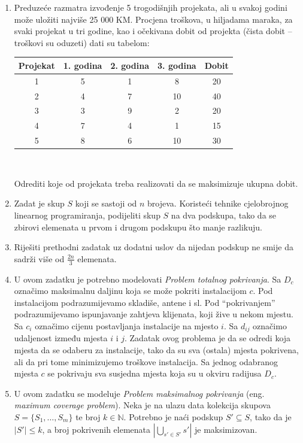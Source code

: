 \documentclass[a4paper, utf8, 11pt, colorlinks]{book}
\theoremstyle{definition}
\begin{document}
\begin{enumerate}
	
	\item Preduzeće  razmatra izvođenje 5 trogodišnjih projekata, ali u svakoj godini može uložiti najviše
	25 000 KM. Procjena troškova, u hiljadama maraka, za svaki projekat u tri godine, kao i
	očekivana dobit od projekta (čista dobit – troškovi su oduzeti)  dati su tabelom:
\begin{center}

	\begin{tabular}{|c|c|c|c|c|}
		\hline
		Projekat & 1. godina & 2. godina & 3. godina & Dobit \\
		\hline
		1 & 5 & 1 & 8 & 20 \\
		\hline
		2 & 4 & 7 & 10 & 40 \\
		\hline
		3 & 3 & 9 & 2 & 20 \\
		\hline
		4 & 7 & 4 & 1 & 15 \\
		\hline
		5 & 8 & 6 & 10 & 30 \\
		\hline
	\end{tabular}  \\
\end{center}
	Odrediti koje od projekata treba realizovati da se maksimizuje ukupna dobit.
	
	\item Zadat je skup $S$ koji se sastoji od $n$ brojeva. Koristeći tehnike cjelobrojnog linearnog programiranja, podijeliti skup $S$ na dva podskupa, tako da se zbirovi elemenata u prvom i drugom podskupu što manje razlikuju.
	
	\item Riješiti prethodni zadatak uz dodatni uslov da nijedan podskup ne smije da sadrži više od $\frac {2n}3$ elemenata.
	

	
	\item U ovom zadatku je potrebno modelovati \emph{Problem totalnog pokrivanja}. %
	Sa $D_c$ označimo maksimalnu daljinu koja se može pokriti instalacijom $c$. Pod instalacijom podrazumijevamo skladiše, antene i sl. Pod ``pokrivanjem'' podrazumijevamo ispunjavanje zahtjeva klijenata, koji žive u nekom mjestu. Sa $c_i$ označimo cijenu postavljanja instalacije na mjesto $i$. Sa $d_{ij}$ označimo udaljenost između mjesta $i$ i $j$. Zadatak ovog problema je da se odredi koja mjesta da se odaberu za instalacije, tako da su sva (ostala) mjesta pokrivena, ali da pri tome minimizujemo troškove instalacija. Sa jednog odabranog mjesta $c$ se pokrivaju sva susjedna mjesta koja su u okviru radijusa $D_c$.  
	\item U ovom zadatku se modeluje  \emph{Problem maksimalnog pokrivanja} (eng. \emph{maximum coverage problem}). Neka je na ulazu data kolekcija skupova  $S=\{ S_1, \ldots, S_m\}$ te broj $k \in \mathbb{N}$. Potrebno je naći podskup $S' \subseteq S$, tako da je $|S'|\leq k$, a broj pokrivenih elemenata $|\bigcup_{s' \in S'} s'|$ je maksimizovan. 
	

\end{enumerate}
\end{document}

